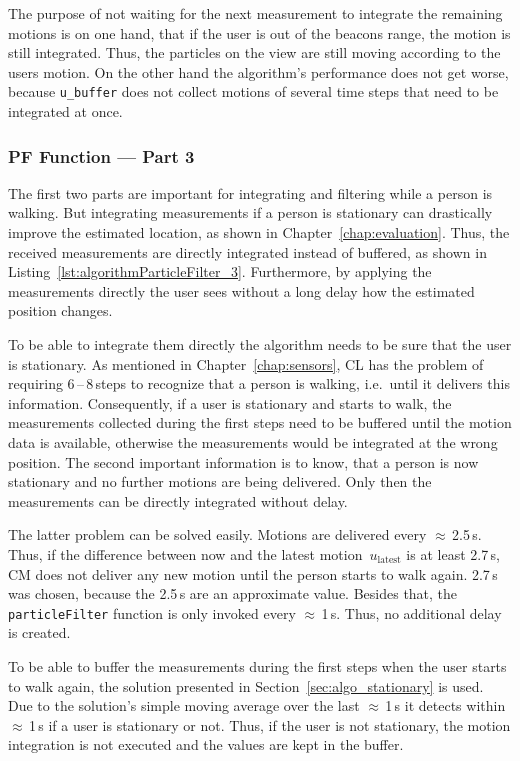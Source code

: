 The purpose of not waiting for the next measurement to integrate the remaining motions is on one hand, that if the user is out of the beacons range, the motion is still integrated. Thus, the particles on the view are still moving according to the users motion. On the other hand the algorithm's performance does not get worse, because \texttt{u\_buffer} does not collect motions of several time steps that need to be integrated at once.




\subsubsection*{\acl{PF} Function --- Part 3}
The first two parts are important for integrating and filtering while a person is walking. But integrating measurements if a person is stationary can drastically improve the estimated location, as shown in Chapter~\ref{chap:evaluation}. Thus, the received measurements are directly integrated instead of buffered, as shown in Listing~\ref{lst:algorithmParticleFilter_3}. Furthermore, by applying the measurements directly the user sees without a long delay how the estimated position changes.

To be able to integrate them directly the algorithm needs to be sure that the user is stationary. As mentioned in Chapter~\ref{chap:sensors}, \acs{CL} has the problem of requiring 6\,--\,8\,steps to recognize that a person is walking, i.e.\ until it delivers this information. Consequently, if a user is stationary and starts to walk, the measurements collected during the first steps need to be buffered until the motion data is available, otherwise the measurements would be integrated at the wrong position. The second important information is to know, that a person is now stationary and no further motions are being delivered. Only then the measurements can be directly integrated without delay.

The latter problem can be solved easily. Motions are delivered every $\approx$\,2.5\,s. Thus, if the difference between now and the latest motion~$u_\text{latest}$ is at least 2.7\,s, \acs{CM} does not deliver any new motion until the person starts to walk again. 2.7\,s was chosen, because the 2.5\,s are an approximate value. Besides that, the \texttt{particleFilter} function is only invoked every $\approx$\,1\,s. Thus, no additional delay is created.

To be able to buffer the measurements during the first steps when the user starts to walk again, the solution presented in Section~\ref{sec:algo_stationary} is used. Due to the solution's simple moving average over the last $\approx$\,1\,s it detects within $\approx$\,1\,s if a user is stationary or not. Thus, if the user is not stationary, the motion integration is not executed and the values are kept in the buffer.

